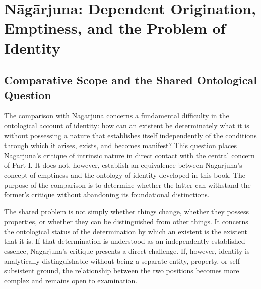 
%
%
%

\section{\texorpdfstring{N\={a}g\={a}rjuna: Dependent Origination, Emptiness, and the Problem of Identity}{Nagarjuna: Dependent Origination, Emptiness, and the Problem of Identity}}
\label{sec:ch08_s18}

\subsection{Comparative Scope and the Shared Ontological Question}
\label{subsec:ch08_s18_ss01}

\label{para:VS.B01.P01.C08.S18.SS01.P001}
The comparison with Nagarjuna concerns a fundamental difficulty in the ontological account of identity: how can an existent be determinately what it is without possessing a nature that establishes itself independently of the conditions through which it arises, exists, and becomes manifest? This question places Nagarjuna's critique of intrinsic nature in direct contact with the central concern of Part I. It does not, however, establish an equivalence between Nagarjuna's concept of emptiness and the ontology of identity developed in this book. The purpose of the comparison is to determine whether the latter can withstand the former's critique without abandoning its foundational distinctions.

\label{para:VS.B01.P01.C08.S18.SS01.P002}
The shared problem is not simply whether things change, whether they possess properties, or whether they can be distinguished from other things. It concerns the ontological status of the determination by which an existent is the existent that it is. If that determination is understood as an independently established essence, Nagarjuna's critique presents a direct challenge. If, however, identity is analytically distinguishable without being a separate entity, property, or self-subsistent ground, the relationship between the two positions becomes more complex and remains open to examination.

